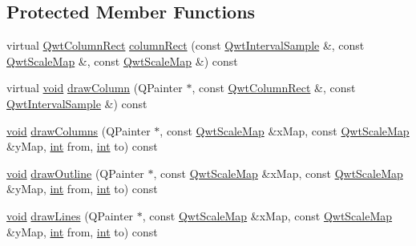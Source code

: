 \subsection*{Protected Member Functions}
\begin{DoxyCompactItemize}
\item 
virtual \hyperlink{class_qwt_column_rect}{Qwt\-Column\-Rect} \hyperlink{class_qwt_plot_histogram_abbda48a6dc315904e0adb94ee4caf569}{column\-Rect} (const \hyperlink{class_qwt_interval_sample}{Qwt\-Interval\-Sample} \&, const \hyperlink{class_qwt_scale_map}{Qwt\-Scale\-Map} \&, const \hyperlink{class_qwt_scale_map}{Qwt\-Scale\-Map} \&) const 
\item 
virtual \hyperlink{group___u_a_v_objects_plugin_ga444cf2ff3f0ecbe028adce838d373f5c}{void} \hyperlink{class_qwt_plot_histogram_a4fe5a32387898f50c95e57603f092d2b}{draw\-Column} (Q\-Painter $\ast$, const \hyperlink{class_qwt_column_rect}{Qwt\-Column\-Rect} \&, const \hyperlink{class_qwt_interval_sample}{Qwt\-Interval\-Sample} \&) const 
\item 
\hyperlink{group___u_a_v_objects_plugin_ga444cf2ff3f0ecbe028adce838d373f5c}{void} \hyperlink{class_qwt_plot_histogram_a53ef2324fd2bc187eb76dfb76c61f426}{draw\-Columns} (Q\-Painter $\ast$, const \hyperlink{class_qwt_scale_map}{Qwt\-Scale\-Map} \&x\-Map, const \hyperlink{class_qwt_scale_map}{Qwt\-Scale\-Map} \&y\-Map, \hyperlink{ioapi_8h_a787fa3cf048117ba7123753c1e74fcd6}{int} from, \hyperlink{ioapi_8h_a787fa3cf048117ba7123753c1e74fcd6}{int} to) const 
\item 
\hyperlink{group___u_a_v_objects_plugin_ga444cf2ff3f0ecbe028adce838d373f5c}{void} \hyperlink{class_qwt_plot_histogram_a9984abfbec9121b8026e9c7103ebec4b}{draw\-Outline} (Q\-Painter $\ast$, const \hyperlink{class_qwt_scale_map}{Qwt\-Scale\-Map} \&x\-Map, const \hyperlink{class_qwt_scale_map}{Qwt\-Scale\-Map} \&y\-Map, \hyperlink{ioapi_8h_a787fa3cf048117ba7123753c1e74fcd6}{int} from, \hyperlink{ioapi_8h_a787fa3cf048117ba7123753c1e74fcd6}{int} to) const 
\item 
\hyperlink{group___u_a_v_objects_plugin_ga444cf2ff3f0ecbe028adce838d373f5c}{void} \hyperlink{class_qwt_plot_histogram_aa42318d0547aca1fff650a0025168890}{draw\-Lines} (Q\-Painter $\ast$, const \hyperlink{class_qwt_scale_map}{Qwt\-Scale\-Map} \&x\-Map, const \hyperlink{class_qwt_scale_map}{Qwt\-Scale\-Map} \&y\-Map, \hyperlink{ioapi_8h_a787fa3cf048117ba7123753c1e74fcd6}{int} from, \hyperlink{ioapi_8h_a787fa3cf048117ba7123753c1e74fcd6}{int} to) const 
\end{DoxyCompactItemize}
